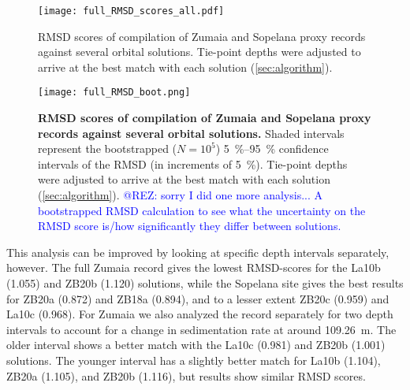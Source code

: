 \documentclass[draft]{agujournal2019}
\newcommand{\ijk}{\textcolor{blue}}
\begin{document}
\setcounter{figure}{2000}
\begin{figure}[htb]
    \centering
    \texttt{[image: full\_RMSD\_scores\_all.pdf]}
    \caption{\label{fig:full-RMSD-all}
        \gls{RMSD} scores of compilation of Zumaia and Sopelana proxy records against several orbital solutions.
        Tie-point depths were adjusted to arrive at the best match with each solution (\cref{sec:algorithm}).
    }
\end{figure}

\setcounter{figure}{2001}
\begin{figure}[htb]
    \centering
    \texttt{[image: full\_RMSD\_boot.png]}
    \caption{\label{fig:full-RMSD-boot}
        \textbf{\gls{RMSD} scores of compilation of Zumaia and Sopelana proxy records against several orbital solutions.}
        Shaded intervals represent the bootstrapped (\(N = 10^{5}\)) \qtyrange{5}{95}{\percent} confidence intervals of the \gls{RMSD} (in increments of \qty{5}{\percent}).
        Tie-point depths were adjusted to arrive at the best match with each solution (\cref{sec:algorithm}).
        \ijk{@REZ: sorry I did one more analysis... A bootstrapped RMSD calculation to see what the uncertainty on the RMSD score is/how significantly they differ between solutions.}
    }
\end{figure}

This analysis can be improved by looking at specific depth intervals separately, however.
The full Zumaia record gives the lowest \gls{RMSD}-scores for the La10b (\num{1.055}) and ZB20b (\num{1.120}) solutions,
while the Sopelana site gives the best results for ZB20a (\num{0.872}) and ZB18a (\num{0.894}), and to a lesser extent ZB20c (\num{0.959}) and La10c (\num{0.968}).
For Zumaia we also analyzed the record separately for two depth intervals to account for a change in sedimentation rate at around \qty{109.26}{\metre}.
The older interval shows a better match with the La10c (\num{0.981}) and ZB20b (1.001) solutions.
The younger interval has a slightly better match for La10b (\num{1.104}), ZB20a (\num{1.105}), and ZB20b (\num{1.116}), but results show similar \gls{RMSD} scores.

\end{document}
